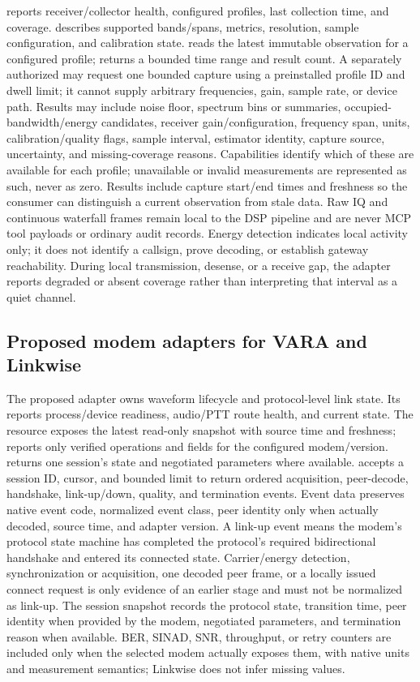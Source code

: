 \documentclass[11pt,a4paper]{article}
\begin{document}
 reports receiver/collector health, configured profiles,
last collection time, and coverage.  describes
supported bands/spans, metrics, resolution, sample configuration, and
calibration state.  reads the latest immutable
observation for a configured profile;  returns a
bounded time range and result count. A separately authorized
 may request one bounded capture using a
preinstalled profile ID and dwell limit; it cannot supply arbitrary
frequencies, gain, sample rate, or device path. Results may include noise
floor, spectrum bins or summaries, occupied-bandwidth/energy candidates,
receiver gain/configuration, frequency span, units, calibration/quality
flags, sample interval, estimator identity, capture source, uncertainty, and
missing-coverage reasons. Capabilities identify which of these are available
for each profile; unavailable or invalid measurements are represented as
such, never as zero. Results include capture start/end times and freshness so
the consumer can distinguish a current observation from stale data. Raw IQ
and continuous waterfall frames remain local to the DSP pipeline and are
never MCP tool payloads or ordinary audit records. Energy detection indicates
local activity only; it does not identify a callsign, prove decoding, or
establish gateway reachability. During local transmission, desense, or a
receive gap, the adapter reports degraded or absent coverage rather than
interpreting that interval as a quiet channel.

\subsection{Proposed modem adapters for VARA and Linkwise}
The proposed adapter owns waveform lifecycle and protocol-level link
state. Its 
reports process/device readiness, audio/PTT route health, and current state.
The  resource exposes the latest read-only
snapshot with source time and freshness;
 reports only verified operations and fields
for the configured modem/version.  returns one
session's state and negotiated parameters where available.
 accepts a session ID, cursor, and bounded limit to
return ordered acquisition, peer-decode, handshake, link-up/down, quality,
and termination events. Event data preserves native event code, normalized
event class, peer identity only when actually decoded, source time, and
adapter version. A link-up event means the modem's protocol state machine has
completed the protocol's required bidirectional handshake and entered its
connected state. Carrier/energy detection, synchronization or acquisition,
one decoded peer frame, or a locally issued connect request is only evidence
of an earlier stage and must not be normalized as link-up. The session
snapshot records the protocol state, transition time, peer identity when
provided by the modem, negotiated parameters, and termination reason when
available. BER, SINAD, SNR, throughput, or retry counters are included
only when the selected modem actually exposes them, with native units and
measurement semantics; Linkwise does not infer missing values.
\end{document}
